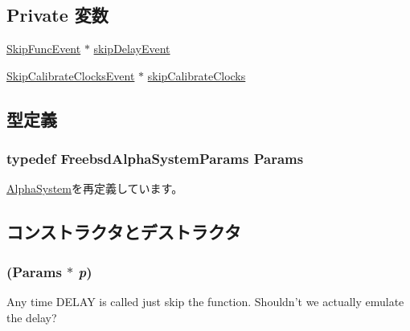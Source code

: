 \subsection*{Private 変数}
\begin{DoxyCompactItemize}
\item 
\hyperlink{classSkipFuncEvent}{SkipFuncEvent} $\ast$ \hyperlink{classFreebsdAlphaSystem_a2701f201ba02c752cc7d29513c1e62e6}{skipDelayEvent}
\item 
\hyperlink{classFreebsdAlphaSystem_1_1SkipCalibrateClocksEvent}{SkipCalibrateClocksEvent} $\ast$ \hyperlink{classFreebsdAlphaSystem_ac0bba0dc3b6587b925fe7210556b8215}{skipCalibrateClocks}
\end{DoxyCompactItemize}


\subsection{型定義}
\hypertarget{classFreebsdAlphaSystem_a0cee38b7e957f9f434ee078d80b94d1b}{
\subsubsection[{Params}]{\setlength{\rightskip}{0pt plus 5cm}typedef FreebsdAlphaSystemParams {\bf Params}}}
\label{classFreebsdAlphaSystem_a0cee38b7e957f9f434ee078d80b94d1b}


\hyperlink{classAlphaSystem_a2af24d7a564ee2ca81332fb46406cbe5}{AlphaSystem}を再定義しています。

\subsection{コンストラクタとデストラクタ}
\hypertarget{classFreebsdAlphaSystem_ad506c0b9afe92910dadb260cbc914a79}{
\subsubsection[{FreebsdAlphaSystem}]{ ({\bf Params} $\ast$ {\em p})}}
\label{classFreebsdAlphaSystem_ad506c0b9afe92910dadb260cbc914a79}


Any time DELAY is called just skip the function. Shouldn't we actually emulate the delay?


